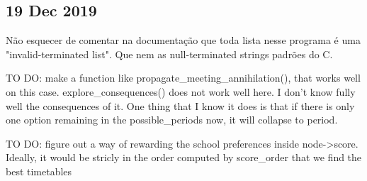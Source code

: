\documentclass{article}
\begin{document}
\subsection{19 Dec 2019}

\par Não esquecer de comentar na documentação que toda lista nesse programa é
uma "invalid-terminated list". Que nem as null-terminated strings padrões do C.

\par TO DO: make a function like propagate\_meeting\_annihilation(),
 that works well on this case. explore\_consequences() does not
 work well here. I don't know fully well the consequences of it.
 One thing that I know it does is that if there is only one option
 remaining in the possible\_periods now, it will collapse to
 period.

\par TO DO: figure out a way of rewarding the school preferences inside
 node->score. Ideally, it would be stricly in the order computed by
 score\_order that we find the best timetables
\end{document}
